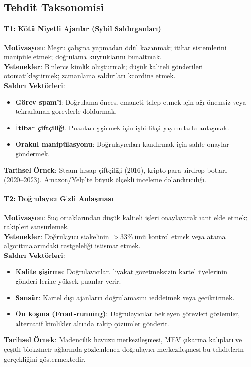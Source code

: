 \documentclass[11pt]{article}
\begin{document}
\begin{itemize}[noitemsep]
\begin{itemize}[noitemsep]
\begin{itemize}[noitemsep]
\begin{itemize}[noitemsep]
\begin{itemize}[noitemsep]
\begin{itemize}[noitemsep]
\begin{itemize}[noitemsep]
\begin{enumerate}[noitemsep]
\begin{itemize}[noitemsep]
\subsection{Tehdit Taksonomisi}

\paragraph{T1: Kötü Niyetli Ajanlar (Sybil Saldırganları)}
\textbf{Motivasyon}: Meşru çalışma yapmadan ödül kazanmak; itibar sistemlerini manipüle etmek; doğrulama kuyruklarını bunaltmak.\\
\textbf{Yetenekler}: Binlerce kimlik oluşturmak; düşük kaliteli gönderileri otomatikleştirmek; zamanlama saldırıları koordine etmek.\\
\textbf{Saldırı Vektörleri}:
\begin{itemize}[noitemsep]
  \item \textbf{Görev spam'i}: Doğrulama öncesi emaneti talep etmek için ağı önemsiz veya tekrarlanan görevlerle doldurmak.
  \item \textbf{İtibar çiftçiliği}: Puanları şişirmek için işbirlikçi yayıncılarla anlaşmak.
  \item \textbf{Orakul manipülasyonu}: Doğrulayıcıları kandırmak için sahte onaylar göndermek.
\end{itemize}
\textbf{Tarihsel Örnek}: Steam hesap çiftçiliği (2016), kripto para airdrop botları (2020--2023), Amazon/Yelp'te büyük ölçekli inceleme dolandırıcılığı.

\paragraph{T2: Doğrulayıcı Gizli Anlaşması}
\textbf{Motivasyon}: Suç ortaklarından düşük kaliteli işleri onaylayarak rant elde etmek; rakipleri sansürlemek.\\
\textbf{Yetenekler}: Doğrulayıcı stake'inin $>33\%$'ünü kontrol etmek veya atama algoritmalarındaki rastgeleliği istismar etmek.\\
\textbf{Saldırı Vektörleri}:
\begin{itemize}[noitemsep]
  \item \textbf{Kalite şişirme}: Doğrulayıcılar, liyakat gözetmeksizin kartel üyelerinin gönderi-lerine yüksek puanlar verir.
  \item \textbf{Sansür}: Kartel dışı ajanların doğrulamasını reddetmek veya geciktirmek.
  \item \textbf{Ön koşma (Front-running)}: Doğrulayıcılar bekleyen görevleri gözlemler, alternatif kimlikler altında rakip çözümler gönderir.
\end{itemize}
\textbf{Tarihsel Örnek}: Madencilik havuzu merkezileşmesi, MEV çıkarma kalıpları ve çeşitli blokzincir ağlarında gözlemlenen doğrulayıcı merkezileşmesi bu tehditlerin gerçekliğini göstermektedir.


\end{itemize}
\end{enumerate}
\end{itemize}
\end{itemize}
\end{itemize}
\end{itemize}
\end{itemize}
\end{itemize}
\end{itemize}
\end{document}
